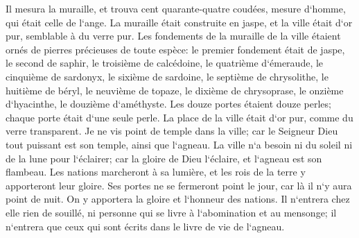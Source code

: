 \verse Il mesura la muraille, et trouva cent quarante-quatre coudées, mesure d`homme, qui était celle de l`ange. 
\verse La muraille était construite en jaspe, et la ville était d`or pur, semblable à du verre pur. 
\verse Les fondements de la muraille de la ville étaient ornés de pierres précieuses de toute espèce: le premier fondement était de jaspe, le second de saphir, le troisième de calcédoine, le quatrième d`émeraude, 
\verse le cinquième de sardonyx, le sixième de sardoine, le septième de chrysolithe, le huitième de béryl, le neuvième de topaze, le dixième de chrysoprase, le onzième d`hyacinthe, le douzième d`améthyste. 
\verse Les douze portes étaient douze perles; chaque porte était d`une seule perle. La place de la ville était d`or pur, comme du verre transparent. 
\verse Je ne vis point de temple dans la ville; car le Seigneur Dieu tout puissant est son temple, ainsi que l`agneau. 
\verse La ville n`a besoin ni du soleil ni de la lune pour l`éclairer; car la gloire de Dieu l`éclaire, et l`agneau est son flambeau. 
\verse Les nations marcheront à sa lumière, et les rois de la terre y apporteront leur gloire. 
\verse Ses portes ne se fermeront point le jour, car là il n`y aura point de nuit. 
\verse On y apportera la gloire et l`honneur des nations. 
\verse Il n`entrera chez elle rien de souillé, ni personne qui se livre à l`abomination et au mensonge; il n`entrera que ceux qui sont écrits dans le livre de vie de l`agneau. 

